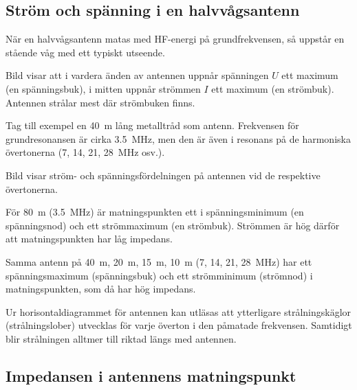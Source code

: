 \newpage
\subsection{Ström och spänning i en halvvågs\-antenn}


När en halvvågsantenn matas med HF-energi på grundfrekvensen, så uppstår en
stående våg med ett typiskt utseende.

Bild  visar att i vardera änden av antennen uppnår spänningen
\(U\) ett maximum (en spänningsbuk), i mitten uppnår strömmen \(I\)
ett maximum (en strömbuk).
Antennen strålar mest där strömbuken finns.

Tag till exempel en \SI{40}{\metre} lång metalltråd som antenn.
Frekvensen för grundresonansen är cirka \SI{3,5}{\mega\hertz}, men den är även i
resonans på de harmoniska övertonerna (7, 14, 21, \SI{28}{\mega\hertz} osv.).

Bild  visar ström- och spänningsfördelningen på antennen vid
de respektive övertonerna.

För \SI{80}{\metre} (\SI{3,5}{\mega\hertz}) är matningspunkten ett i
spänningsminimum (en spänningsnod) och ett strömmaximum (en strömbuk).
Strömmen är hög därför att matningspunkten har låg impedans.

Samma antenn på \SI{40}{\metre}, \SI{20}{\metre}, \SI{15}{\metre},
\SI{10}{\metre} (7, 14, 21, \SI{28}{\mega\hertz}) har ett spänningsmaximum
(spänningsbuk) och ett strömminimum (strömnod) i matningspunkten, som då har hög
impedans.

Ur horisontaldiagrammet för antennen kan utläsas att ytterligare
strålningskäglor (strålningslober) utvecklas för varje överton i den
påmatade frekvensen.
Samtidigt blir strålningen alltmer till riktad längs med antennen.

\subsection{Impedansen i antennens matningspunkt}
\label{antenner_impedans}


